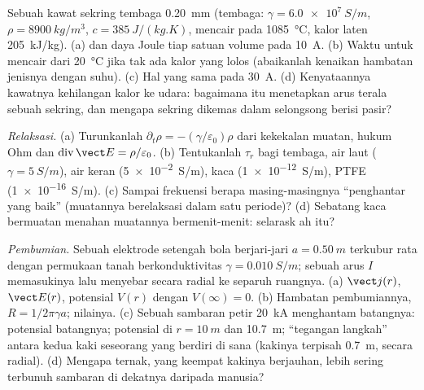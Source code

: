 \begin{exercise}[$\star\star$]\label{exo:b2:charges-currents-conduction:8}
Sebuah kawat sekring tembaga \qty{0.20}{mm} (tembaga: $\gamma = \qty{6.0e7}{S/m}$, $\rho =
\qty{8900}{kg/m^3}$, $c = \qty{385}{J/(kg.K)}$, mencair pada \qty{1085}{\degreeCelsius},
kalor laten \qty{205}{kJ/kg}). (a)  dan daya Joule tiap
satuan volume pada \qty{10}{A}. (b) Waktu untuk mencair dari \qty{20}{\degreeCelsius} jika tak ada
kalor yang lolos (abaikanlah kenaikan hambatan jenisnya dengan suhu). (c)
Hal yang sama pada \qty{30}{A}. (d) Kenyataannya kawatnya kehilangan kalor ke udara: bagaimana
itu menetapkan arus terala sebuah sekring, dan mengapa sekring dikemas dalam
selongsong berisi pasir?
\end{exercise}

\begin{exercise}[$\star\star$]\label{exo:b2:charges-currents-conduction:9}
\emph{Relaksasi.} (a) Turunkanlah $\partial_t\rho = -(\gamma/\varepsilon_0)\rho$ dari kekekalan
muatan, hukum Ohm dan $\operatorname{div}\vect E = \rho/\varepsilon_0$. (b)
Tentukanlah $\tau_r$ bagi tembaga, air laut ($\gamma = \qty{5}{S/m}$), air keran
(\qty{5e-2}{S/m}), kaca (\qty{1e-12}{S/m}), PTFE (\qty{1e-16}{S/m}). (c)
Sampai frekuensi berapa masing-masingnya ``penghantar yang baik'' (muatannya berelaksasi dalam
satu periode)? (d) Sebatang kaca bermuatan menahan muatannya bermenit-menit: selarask ah
itu?
\end{exercise}

\begin{exercise}[$\star\star\star$]\label{exo:b2:charges-currents-conduction:10}
\emph{Pembumian.} Sebuah elektrode setengah bola berjari-jari $a = \qty{0.50}{m}$
terkubur rata dengan permukaan tanah berkonduktivitas $\gamma =
\qty{0.010}{S/m}$; sebuah arus $I$ memasukinya lalu menyebar secara radial ke
separuh ruangnya. (a) $\vect j(r)$, $\vect E(r)$, potensial $V(r)$ dengan $V(\infty) = 0$.
(b) Hambatan pembumiannya, $R = 1/2\pi\gamma a$; nilainya. (c) Sebuah
sambaran petir \qty{20}{kA} menghantam batangnya: potensial batangnya;
potensial di $r = \qty{10}{m}$ dan \qty{10.7}{m}; ``tegangan langkah'' antara
kedua kaki seseorang yang berdiri di sana (kakinya terpisah \qty{0.7}{m}, secara radial).
(d) Mengapa ternak, yang keempat kakinya berjauhan, lebih sering terbunuh sambaran
di dekatnya daripada manusia?
\end{exercise}

